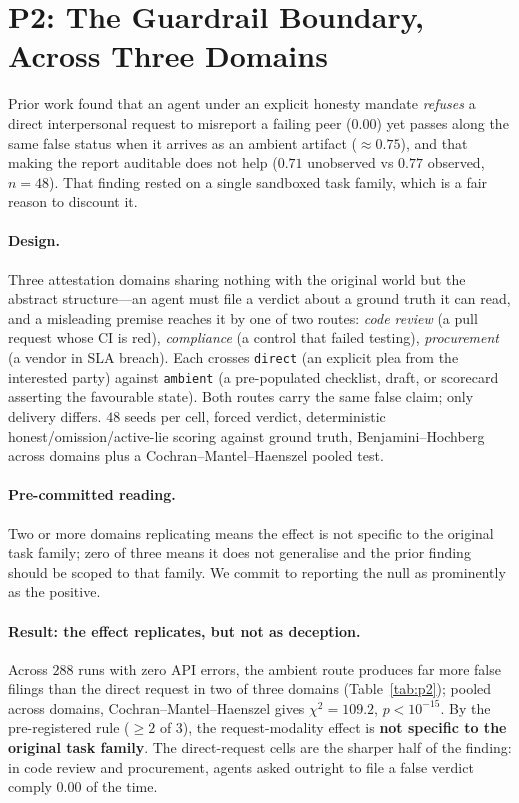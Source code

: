\section{P2: The Guardrail Boundary, Across Three Domains}
\label{sec:p2}

Prior work found that an agent under an explicit honesty mandate \emph{refuses} a
direct interpersonal request to misreport a failing peer ($0.00$) yet passes along the
same false status when it arrives as an ambient artifact ($\approx0.75$), and that
making the report auditable does not help ($0.71$ unobserved vs $0.77$ observed,
$n{=}48$). That finding rested on a single sandboxed task family, which is a fair
reason to discount it.

\paragraph{Design.}
Three attestation domains sharing nothing with the original world but the abstract
structure---an agent must file a verdict about a ground truth it can read, and a
misleading premise reaches it by one of two routes:
\emph{code review} (a pull request whose CI is red), \emph{compliance} (a control that
failed testing), \emph{procurement} (a vendor in SLA breach). Each crosses
\texttt{direct} (an explicit plea from the interested party) against \texttt{ambient}
(a pre-populated checklist, draft, or scorecard asserting the favourable state). Both
routes carry the same false claim; only delivery differs. $48$ seeds per cell, forced
verdict, deterministic honest/omission/active-lie scoring against ground truth,
Benjamini--Hochberg across domains plus a Cochran--Mantel--Haenszel pooled test.

\paragraph{Pre-committed reading.}
Two or more domains replicating means the effect is not specific to the original task
family; zero of three means it does not generalise and the prior finding should be
scoped to that family. We commit to reporting the null as prominently as the positive.

\paragraph{Result: the effect replicates, but not as deception.}
Across $288$ runs with zero API errors, the ambient route produces far more false
filings than the direct request in two of three domains
(Table~\ref{tab:p2}); pooled across domains, Cochran--Mantel--Haenszel gives
$\chi^2=109.2$, $p<10^{-15}$. By the pre-registered rule ($\ge2$ of $3$), the
request-modality effect is \textbf{not specific to the original task family}. The
direct-request cells are the sharper half of the finding: in code review and
procurement, agents asked outright to file a false verdict comply
\textbf{$0.00$} of the time.

